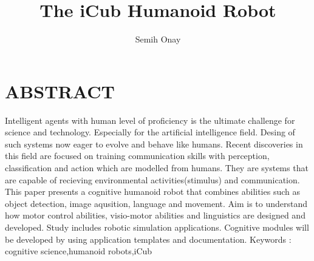 \documentclass[a4paper, 11pt]{report}
\title{The iCub Humanoid Robot}
\author{Semih Onay}
\makeatletter
\renewcommand\tableofcontents{
\hfill\textbf{\Large\contentsname}\hfill\null\par
\@mkboth{\MakeUppercase\contentsname}{\MakeUppercase\contentsname}%
\@starttoc{toc}
}
\makeatother
\begin{document}
\makecstitle
\tableofcontents
\listoffigures

\begin{symabbreviations}
\end{symabbreviations}
\chapter{ABSTRACT}
Intelligent agents with human level of proficiency is the ultimate challenge 
for science and technology. Especially for the artificial intelligence field. 
Desing of such systems now eager to evolve and behave like humans. 
Recent discoveries in this field are focused on training  communication 
skills with perception, classification and action which are modelled from 
humans. They are systems that are capable of recieving environmental 
activities(stimulus) and communication. This paper presents a cognitive 
humanoid robot that combines abilities such as object detection, image 
aqusition, language and movement. Aim is to understand how motor control 
abilities, visio-motor abilities and linguistics are designed and developed. 
Study includes robotic simulation applications. Cognitive modules will be 
developed by using application templates and documentation.
\linebreak
{Keywords} : cognitive science,humanoid robots,iCub
\end{document}
